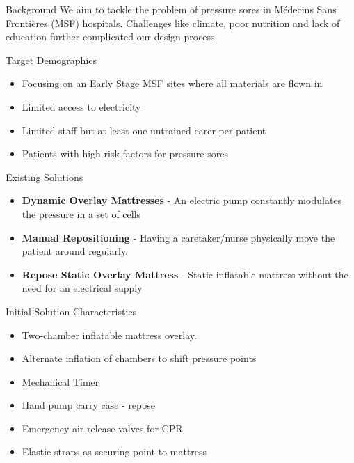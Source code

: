 \documentclass[final]{beamer}
\newlength{\onecolwid}
\begin{document}
\begin{frame}
\begin{columns}[t]
\begin{column}{\onecolwid}
\begin{block}{Background}
We aim to tackle the problem of pressure sores in M\'edecins Sans Fronti\`eres (MSF) hospitals. Challenges like climate, poor nutrition and lack of education further complicated our design process.
\end{block}

\begin{block}{Target Demographics}
\begin{itemize}
\item Focusing on an Early Stage MSF sites where all materials are flown in
\item Limited access to electricity
\item Limited staff but at least one untrained carer per patient
\item Patients with high risk factors for pressure sores
\end{itemize}

\end{block}


\begin{block}{Existing Solutions}
\begin{itemize}
\item \textbf{Dynamic Overlay Mattresses} - An electric pump constantly modulates the pressure in a set of cells
\item \textbf{Manual Repositioning} - Having a caretaker/nurse physically move the patient around regularly.
\item \textbf{Repose Static Overlay Mattress} - Static inflatable mattress without the need for an electrical supply
\end{itemize}

\end{block}

\begin{block}{Initial Solution Characteristics}
\begin{itemize}
\item Two-chamber inflatable mattress overlay. 
\item Alternate inflation of chambers to shift pressure points
\item Mechanical Timer
\item Hand pump carry case - repose
\item Emergency air release valves for CPR
\item Elastic straps as securing point to mattress
\end{itemize}
\end{block}


\end{column}
\end{columns}
\end{frame}
\end{document}
